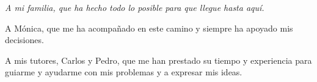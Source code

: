 
\thispagestyle{empty}
{}

\hfill
\vfill

\begin{center}
\itshape
A mi familia, que ha hecho todo lo posible para que llegue hasta aquí.\newline

A Mónica, que me ha acompañado en este camino y siempre ha apoyado mis decisiones.\newline

A mis tutores, Carlos y Pedro, que me han prestado su tiempo y experiencia para guiarme y ayudarme con mis problemas y a expresar mis ideas.
\end{center}

\vfill

\cleardoublepage
\endinput
